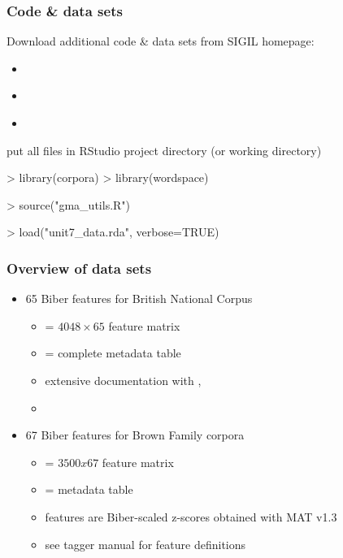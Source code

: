 \documentclass[t]{beamer} %
\begin{document}
\begin{frame}[fragile]
  \frametitle{Code \& data sets}

  Download additional code \& data sets from SIGIL homepage:
  \begin{itemize}
  \item \href{http://www.stefan-evert.de/SIGIL/sigil_R/materials/multivar_utils.R}{}
  \item \href{http://www.stefan-evert.de/SIGIL/sigil_R/data/unit7_data.rda}{}
  \item[]
  \end{itemize}

  \hand{} put all files in RStudio project directory (or working directory)

  \gap[1]
\begin{Rcode}
> library(corpora)           
> library(wordspace)         

> source("gma_utils.R")      

> load("unit7_data.rda", verbose=TRUE) 
\end{Rcode}
\end{frame}

\begin{frame}
  \frametitle{Overview of data sets}

  \begin{itemize}
  \item 65 Biber features for British National Corpus
    \begin{itemize}
    \item {} = $4048\times 65$ feature matrix
    \item {} = complete metadata table
    \item extensive documentation with , 
    \item[]
    \end{itemize}
  \item 67 Biber features for Brown Family corpora
    \begin{itemize}
    \item {} = $3500 x 67$ feature matrix
    \item {} = metadata table
    \item features are Biber-scaled z-scores obtained with MAT v1.3\\
      {\footnotesize{}}
    \item see tagger manual for feature definitions
    \end{itemize}
  \end{itemize}
\end{frame}
\end{document}
